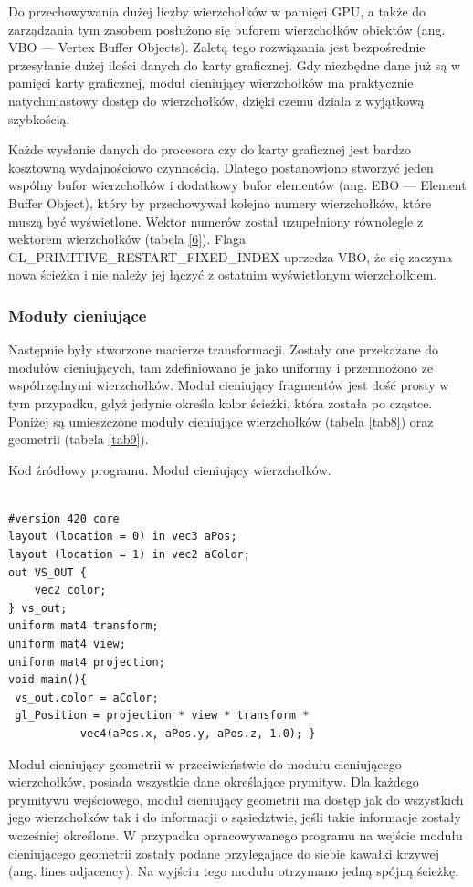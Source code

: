Do przechowywania dużej liczby wierzchołków w pamięci GPU, a także do zarządzania tym zasobem posłużono się buforem wierzchołków obiektów (ang. VBO --- Vertex Buffer Objects). Zaletą tego rozwiązania jest bezpośrednie przesyłanie dużej ilości danych do karty graficznej. Gdy niezbędne dane już są w pamięci karty graficznej, moduł cieniujący wierzchołków ma praktycznie natychmiastowy dostęp do wierzchołków, dzięki czemu działa z wyjątkową szybkością.

Każde wysłanie danych do procesora czy do karty graficznej jest bardzo kosztowną wydajnościowo czynnością. Dlatego postanowiono stworzyć jeden wspólny bufor wierzchołków i dodatkowy bufor elementów (ang. EBO --- Element Buffer Object), który by przechowywał kolejno numery wierzchołków, które muszą być wyświetlone. Wektor numerów został uzupełniony równolegle z wektorem wierzchołków (tabela \ref{6}). Flaga GL\_PRIMITIVE\_RESTART\_FIXED\_INDEX uprzedza VBO, że się zaczyna nowa ścieżka i nie należy jej łączyć z ostatnim wyświetlonym wierzchołkiem.

\subsubsection{Moduły cieniujące}
Następnie były stworzone macierze transformacji. Zostały one przekazane do modułów cieniujących, tam zdefiniowano je jako uniformy i przemnożono ze współrzędnymi wierzchołków. Moduł cieniujący fragmentów jest dość prosty w tym przypadku, gdyż jedynie określa kolor ścieżki, która została po cząstce. Poniżej są umieszczone moduły cieniujące wierzchołków (tabela \ref{tab8}) oraz geometrii (tabela \ref{tab9}).
\begin{table}[H]
\caption{Kod źródłowy programu. Moduł cieniujący wierzchołków.}
\label{tab8}
\begin{lstlisting}[frame=single]  % Start your code-block

#version 420 core
layout (location = 0) in vec3 aPos;
layout (location = 1) in vec2 aColor;
out VS_OUT {
    vec2 color;
} vs_out;
uniform mat4 transform;
uniform mat4 view;
uniform mat4 projection;
void main(){
 vs_out.color = aColor;
 gl_Position = projection * view * transform * 
           vec4(aPos.x, aPos.y, aPos.z, 1.0); }
\end{lstlisting}
\end{table}

Moduł cieniujący geometrii w przeciwieństwie do modułu cieniującego wierzchołków, posiada wszystkie dane określające prymityw. Dla każdego prymitywu wejściowego, moduł cieniujący geometrii ma dostęp jak do wszystkich jego wierzchołków tak i do informacji o sąsiedztwie, jeśli takie informacje zostały wcześniej określone. W przypadku opracowywanego programu na wejście modułu cieniującego geometrii zostały podane przylegające do siebie kawałki krzywej (ang. lines adjacency). Na wyjściu tego modułu otrzymano jedną spójną ścieżkę.

